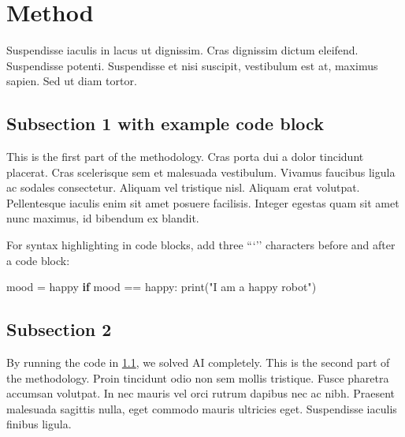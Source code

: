 \documentclass[12pt,a4paper,]{report}
\newenvironment{Shaded}{}{}
\newcommand{\BuiltInTok}[1]{#1}
\newcommand{\ControlFlowTok}[1]{\textcolor[rgb]{0.00,0.44,0.13}{\textbf{#1}}}
\newcommand{\NormalTok}[1]{#1}
\newcommand{\OperatorTok}[1]{\textcolor[rgb]{0.40,0.40,0.40}{#1}}
\newcommand{\StringTok}[1]{\textcolor[rgb]{0.25,0.44,0.63}{#1}}
\begin{document}
\hypertarget{method}{%
\section{Method}\label{method}}

Suspendisse iaculis in lacus ut dignissim. Cras dignissim dictum
eleifend. Suspendisse potenti. Suspendisse et nisi suscipit, vestibulum
est at, maximus sapien. Sed ut diam tortor.

\hypertarget{subsection-1-with-example-code-block}{%
\subsection{Subsection 1 with example code
block}\label{subsection-1-with-example-code-block}}

This is the first part of the methodology. Cras porta dui a dolor
tincidunt placerat. Cras scelerisque sem et malesuada vestibulum.
Vivamus faucibus ligula ac sodales consectetur. Aliquam vel tristique
nisl. Aliquam erat volutpat. Pellentesque iaculis enim sit amet posuere
facilisis. Integer egestas quam sit amet nunc maximus, id bibendum ex
blandit.

For syntax highlighting in code blocks, add three ```'' characters
before and after a code block:

\begin{Shaded}
\begin{Highlighting}[]
\NormalTok{mood }\OperatorTok{=} \StringTok{\textquotesingle{}happy\textquotesingle{}}
\ControlFlowTok{if}\NormalTok{ mood }\OperatorTok{==} \StringTok{\textquotesingle{}happy\textquotesingle{}}\NormalTok{:}
    \BuiltInTok{print}\NormalTok{(}\StringTok{"I am a happy robot"}\NormalTok{)}
\end{Highlighting}
\end{Shaded}

\hypertarget{subsection-2}{%
\subsection{Subsection 2}\label{subsection-2}}

By running the code in \cref{subsection-1-with-example-code-block}, we
solved AI completely. This is the second part of the methodology. Proin
tincidunt odio non sem mollis tristique. Fusce pharetra accumsan
volutpat. In nec mauris vel orci rutrum dapibus nec ac nibh. Praesent
malesuada sagittis nulla, eget commodo mauris ultricies eget.
Suspendisse iaculis finibus ligula.
\end{document}

